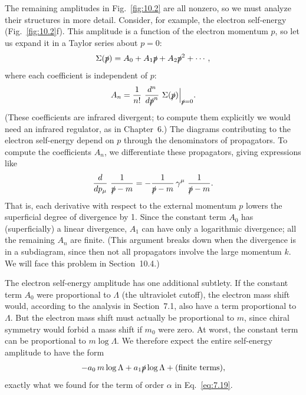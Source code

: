 The remaining amplitudes in Fig.~\ref{fig:10.2} are all nonzero, so we must
analyze their structures in more detail.  Consider, for example, the electron
self-energy (Fig.~\ref{fig:10.2}f).  This amplitude is a function of the
electron momentum $p$, so let us expand it in a Taylor series about $p = 0$:
\begin{equation}
  \Sigma(\slashed{p}) = A_0 + A_1\slashed{p} + A_2\slashed{p}^2 + \cdots ,
\end{equation}
where each coefficient is independent of $p$:
\begin{equation}
  A_n = \frac{1}{n!}\ \frac{d^n}{d\slashed{p}^n}\ \Sigma(\slashed{p})
    \Big|_{\slashed{p}=0} .
\end{equation}
(These coefficients are infrared divergent; to compute them explicitly we
would need an infrared regulator, as in Chapter~6.)  The diagrams contributing
to the electron self-energy depend on $p$ through the denominators of
propagators.  To compute the coefficients $A_n$, we differentiate these
propagators, giving expressions like
\begin{equation}
  \frac{d}{dp_\mu}\ \frac{1}{\slashed{p}-m} = -\frac{1}{\slashed{p}-m}\,
    \gamma^\mu\ \frac{1}{\slashed{p}-m} .
\end{equation}
That is, each derivative with respect to the external momentum $p$ lowers the
superficial degree of divergence by 1.  Since the constant term $A_0$ has
(superficially) a linear divergence, $A_1$ can have only a logarithmic
divergence; all the remaining $A_n$ are finite.  (This argument breaks down
when the divergence is in a subdiagram, since then not all propagators involve
the large momentum $k$.  We will face this problem in Section~10.4.)

The electron self-energy amplitude has one additional subtlety.  If the
constant term $A_0$ were proportional to $\Lambda$ (the ultraviolet cutoff),
the electron mass shift would, according to the analysis in Section~7.1, also
have a term proportional to $\Lambda$.  But the electron mass shift must
actually be proportional to $m$, since chiral symmetry would forbid a mass
shift if $m_0$ were zero.  At worst, the constant term can be proportional to
$m\log\Lambda$.  We therefore expect the entire self-energy amplitude to have
the form
\begin{equation}
  -a_0\,m\log\Lambda + a_1\slashed{p}\log\Lambda + (\text{finite terms}),
  \label{eq:10.6}
\end{equation}
exactly what we found for the term of order $\alpha$ in Eq.~\eqref{eq:7.19}.

